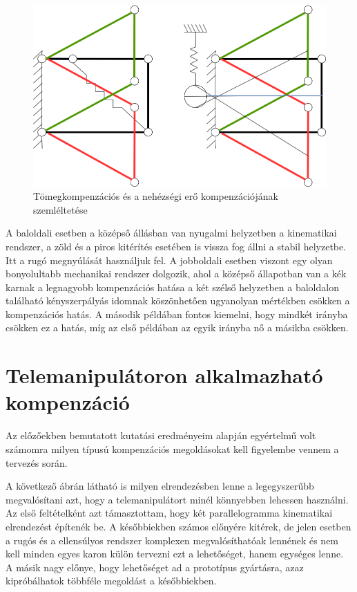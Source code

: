 \begin{figure}[!ht]
\centering
\includegraphics[width=125mm, keepaspectratio]{figures/Diagrammok/Tomeg_VS_Gravkomp}
\caption{Tömegkompenzációs és a nehézségi erő kompenzációjának szemléltetése}
\label{fig:Tomeg_VS_Gravkomp}
\end{figure}

A baloldali esetben a középső állásban van nyugalmi helyzetben a kinematikai rendszer, a zöld  és a piros kitérítés esetében is vissza fog állni a stabil helyzetbe. Itt a rugó megnyúlását használjuk fel. A jobboldali esetben viszont egy olyan bonyolultabb mechanikai rendszer dolgozik, ahol a középső állapotban van a kék karnak a legnagyobb kompenzációs hatása a két szélső helyzetben a baloldalon található kényszerpályás idomnak köszönhetően ugyanolyan mértékben csökken a kompenzációs hatás. A második példában fontos kiemelni, hogy mindkét irányba csökken ez a hatás, míg az első példában az egyik irányba nő a másikba csökken.

\section{Telemanipulátoron alkalmazható kompenzáció}

Az előzőekben bemutatott kutatási eredményeim alapján egyértelmű volt számomra milyen típusú kompenzációs megoldásokat kell figyelembe vennem a tervezés során.

A következő ábrán látható is milyen elrendezésben lenne a legegyszerűbb megvalósítani azt, hogy a telemanipulátort minél könnyebben lehessen használni. Az első feltételként azt támasztottam, hogy két parallelogramma kinematikai elrendezést építenék be. A későbbiekben számos előnyére kitérek, de jelen esetben a rugós és a ellensúlyos rendszer komplexen megvalósíthatóak lennének és nem kell minden egyes karon külön tervezni ezt a lehetőséget, hanem egységes lenne. A másik nagy előnye, hogy lehetőséget ad a prototípus gyártásra, azaz kipróbálhatok többféle megoldást a későbbiekben.

